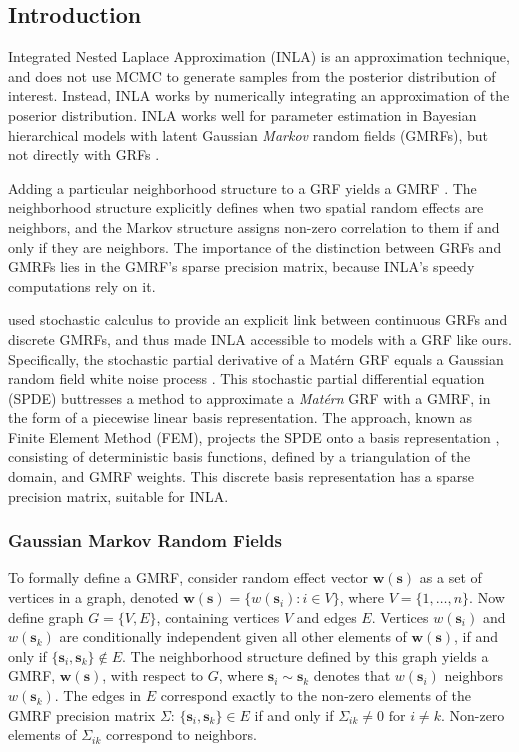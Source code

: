\subsection{Introduction} %

Integrated Nested Laplace Approximation (INLA) is an approximation technique, and does not use MCMC to generate samples from the posterior distribution of interest. Instead, INLA works by numerically integrating an approximation of the poserior distribution. INLA works well for parameter estimation in Bayesian hierarchical models with latent Gaussian {\it Markov} random fields (GMRFs), but not directly with GRFs \citep{Rue2007}.

Adding a particular neighborhood structure to a GRF yields a GMRF \citep{Rue2007}. The neighborhood structure explicitly defines when two spatial random effects are neighbors, and the Markov structure assigns non-zero correlation to them if and only if they are neighbors. The importance of the distinction between GRFs and GMRFs lies in the GMRF's sparse precision matrix, because INLA's speedy computations rely on it.

\cite{Lindgren2011} used stochastic calculus \citep{Mao2007} to provide an explicit link between continuous GRFs and discrete GMRFs, and thus made INLA accessible to models with a GRF like ours. Specifically, the stochastic partial derivative of a Mat\'ern GRF equals a Gaussian random field white noise process \citep{Lindgren2011}. This stochastic partial differential equation (SPDE) buttresses a method to approximate a {\it Mat\'ern} GRF with a GMRF, in the form of a piecewise linear basis representation. The approach, known as Finite Element Method (FEM), projects the SPDE onto a basis representation \citep{Dhatt2012}, consisting of deterministic basis functions, defined by a triangulation of the domain, and GMRF weights. This discrete basis representation has a sparse precision matrix, suitable for INLA. 

\subsubsection{Gaussian Markov Random Fields} %

To formally define a GMRF, consider random effect vector $\pmb{w}(\pmb{s})$ as a set of vertices in a graph, denoted $\pmb{w}(\pmb{s}) = \{w(\pmb{s}_{i}):i \in V\}$, where $V = \{1,\dots,n\}$. Now define graph $G = \{ V, E \}$, containing vertices $V$ and edges $E$. Vertices $w(\pmb{s}_{i})$ and $w(\pmb{s}_{k})$ are conditionally independent given all other elements of $\pmb{w}(\pmb{s})$, if and only if $\{\pmb{s}_{i}, \pmb{s}_{k}\} \notin E$. The neighborhood structure defined by this graph yields a GMRF, $\pmb{w}(\pmb{s})$, with respect to $G$, where $\pmb{s}_{i} \sim \pmb{s}_{k}$ denotes that $w(\pmb{s}_{i})$ neighbors $w(\pmb{s}_{k})$. The edges in $E$ correspond exactly to the non-zero elements of the GMRF precision matrix $\Sigma$: $\{\pmb{s}_{i}, \pmb{s}_{k}\} \in E$ if and only if $\Sigma_{ik} \neq 0 \text{ for } i \neq k$. Non-zero elements of $\Sigma_{ik}$ correspond to neighbors.


